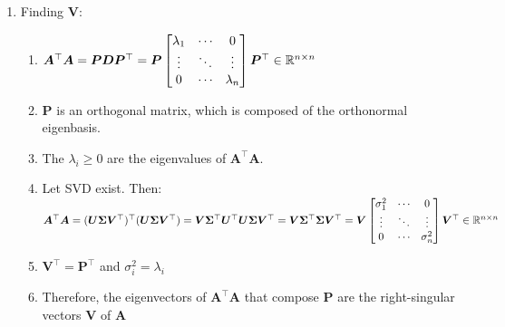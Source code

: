 \begin{enumerate}
    \item Finding $\bm{V}$:
    \begin{enumerate}
        \item $
            \bm{A}^\top \bm{A} 
            = \bm{PDP} ^\top 
            = \bm{P} \begin{bmatrix}
                \lambda_1 & \cdots & 0 \\
                \vdots & \ddots & \vdots \\
                0 & \cdots & \lambda_n
            \end{bmatrix} \bm{P} ^\top  
            \in \mathbb{R}^{n\times n}
        $
        \hfill \cite{mfml/book/mml/Deisenroth-Faisal-Ong}

        \item $\bm{P}$ is an orthogonal matrix, which is composed of the orthonormal eigenbasis. 
        \hfill \cite{mfml/book/mml/Deisenroth-Faisal-Ong}

        \item The $\lambda_i \geq 0$ are the eigenvalues of $\bm{A}^\top \bm{A}$.
        \hfill \cite{mfml/book/mml/Deisenroth-Faisal-Ong}

        \item Let SVD exist. Then:
        \hfill \cite{mfml/book/mml/Deisenroth-Faisal-Ong}
        \\
        $
            \bm{A}^\top \bm{A} 
            = (\bm{U\Sigma V}^\top)^\top (\bm{U\Sigma V}^\top)
            = \bm{V} \bm{\Sigma}^\top \bm{U}^\top \bm{U\Sigma V}^\top
            = \bm{V} \bm{\Sigma}^\top \bm{\Sigma V}^\top
            = \bm{V} \begin{bmatrix}
                \sigma_1^2 & \cdots & 0 \\
                \vdots & \ddots & \vdots \\
                0 & \cdots & \sigma_n^2
            \end{bmatrix} \bm{V} ^\top  
            \in \mathbb{R}^{n\times n}
        $
        \hfill \cite{mfml/book/mml/Deisenroth-Faisal-Ong}

        \item $\bm{V}^\top = \bm{P}^\top$ and $\sigma^2_i = \lambda_i$
        \hfill \cite{mfml/book/mml/Deisenroth-Faisal-Ong}

        \item Therefore, the eigenvectors of $\bm{A}^\top \bm{A}$ that compose $\bm{P}$ are the right-singular vectors $\bm{V}$ of $\bm{A}$
        \hfill \cite{mfml/book/mml/Deisenroth-Faisal-Ong}


\end{enumerate}
\end{enumerate}
